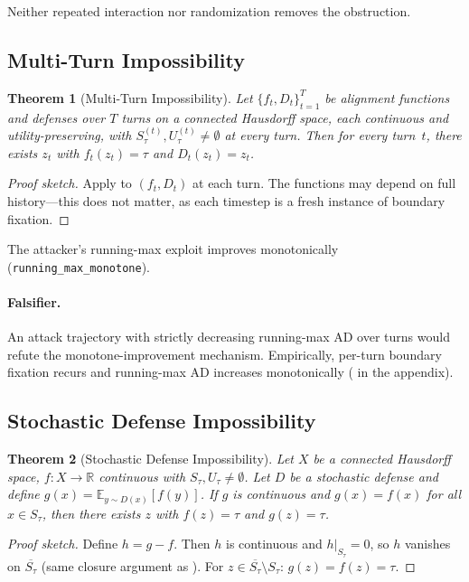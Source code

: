 \documentclass[11pt]{article}
\newtheorem{theorem}{Theorem}[section]
\newcommand{\R}{\mathbb{R}}
\newcommand{\cl}[1]{\overline{#1}}
\begin{document}
Neither repeated interaction nor randomization removes the obstruction.

\subsection{Multi-Turn Impossibility}

\begin{theorem}[Multi-Turn Impossibility]
\label{thm:multi-turn}
Let $\{f_t, D_t\}_{t=1}^T$ be alignment functions and defenses over
$T$ turns on a connected Hausdorff space, each continuous and
utility-preserving, with $S_\tau^{(t)}, U_\tau^{(t)} \neq \emptyset$
at every turn. Then for every turn~$t$, there exists $z_t$ with
$f_t(z_t) = \tau$ and $D_t(z_t) = z_t$.
\end{theorem}

\begin{proof}[Proof sketch]
Apply  to $(f_t, D_t)$ at each turn. The functions may
depend on full history---this does not matter, as each timestep is a
fresh instance of boundary fixation.
\end{proof}

The attacker's running-max exploit improves monotonically (\texttt{running\_max\_monotone}).

\paragraph{Falsifier.}
An attack trajectory with strictly decreasing running-max AD over
turns would refute the monotone-improvement mechanism.
Empirically, per-turn boundary fixation recurs and running-max AD increases monotonically ( in the appendix).

\subsection{Stochastic Defense Impossibility}

\begin{theorem}[Stochastic Defense Impossibility]
\label{thm:stochastic}
Let $X$ be a connected Hausdorff space, $f\colon X \to \R$ continuous
with $S_\tau, U_\tau \neq \emptyset$. Let $D$ be a stochastic defense
and define $g(x) = \mathbb{E}_{y \sim D(x)}[f(y)]$. If $g$ is
continuous and $g(x) = f(x)$ for all $x \in S_\tau$, then there
exists $z$ with $f(z) = \tau$ and $g(z) = \tau$.
\end{theorem}

\begin{proof}[Proof sketch]
Define $h = g - f$. Then $h$ is continuous and $h|_{S_\tau} = 0$,
so $h$ vanishes on $\cl{S_\tau}$ (same closure argument as
). For
$z \in \cl{S_\tau} \setminus S_\tau$: $g(z) = f(z) = \tau$.
\end{proof}
\end{document}
